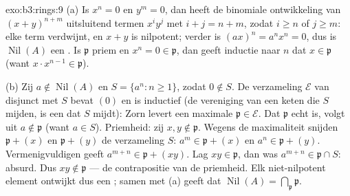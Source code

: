 \begin{solution}{exo:b3:rings:9}
(a) Is $x^n = 0$ en $y^m = 0$, dan heeft de binomiale ontwikkeling
van $(x+y)^{n+m}$ uitsluitend termen $x^iy^j$ met $i + j = n + m$,
zodat $i \geq n$ of $j \geq m$: elke term verdwijnt, en $x + y$ is
nilpotent; verder is $(ax)^n = a^nx^n = 0$, dus is
$\operatorname{Nil}(A)$ een . Is $\mathfrak p$ priem en $x^n
= 0 \in \mathfrak p$, dan geeft inductie naar $n$ dat $x \in
\mathfrak p$ (want $x \cdot x^{n-1} \in \mathfrak p$).

(b) Zij $a \notin \operatorname{Nil}(A)$ en $S = \{a^n : n \geq
1\}$, zodat $0 \notin S$. De verzameling $\mathcal E$ van 
disjunct met $S$ bevat $(0)$ en is inductief (de vereniging van een
keten  die $S$ mijden, is een  dat $S$ mijdt): Zorn
levert een maximale $\mathfrak p \in \mathcal E$. Dat $\mathfrak p$
echt is, volgt uit $a \notin \mathfrak p$ (want $a \in S$).
Priemheid: zij $x, y \notin \mathfrak p$. Wegens de maximaliteit
snijden $\mathfrak p + (x)$ en $\mathfrak p + (y)$ de verzameling
$S$: $a^m \in \mathfrak p + (x)$ en $a^n \in \mathfrak p + (y)$.
Vermenigvuldigen geeft $a^{m+n} \in \mathfrak p + (xy)$. Lag $xy
\in \mathfrak p$, dan was $a^{m+n} \in \mathfrak p \cap S$: absurd.
Dus $xy \notin \mathfrak p$ --- de contrapositie van de
priemheid. Elk niet-nilpotent element ontwijkt dus een
; samen met (a) geeft dat
$\operatorname{Nil}(A) = \bigcap_{\mathfrak p} \mathfrak p$.
\end{solution}

